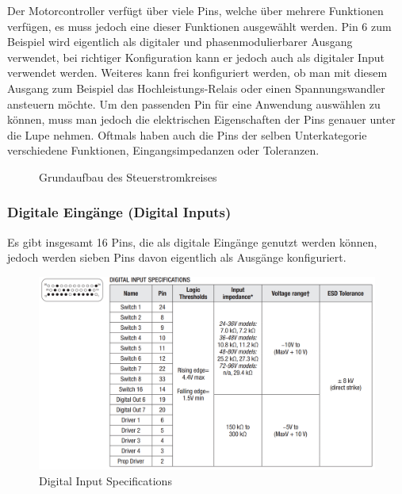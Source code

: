 \vspace{5mm}

Der Motorcontroller verfügt über viele Pins, welche über mehrere Funktionen verfügen, es muss jedoch eine dieser Funktionen ausgewählt werden. Pin 6 zum Beispiel wird eigentlich als digitaler und phasenmodulierbarer Ausgang verwendet, bei richtiger Konfiguration kann er jedoch auch als digitaler Input verwendet werden. Weiteres kann frei konfiguriert werden, ob man mit diesem Ausgang zum Beispiel das Hochleistungs-Relais oder einen Spannungswandler ansteuern möchte. Um den passenden Pin für eine Anwendung auswählen zu können, muss man jedoch die elektrischen Eigenschaften der Pins genauer unter die Lupe nehmen. Oftmals haben auch die Pins der selben Unterkategorie verschiedene Funktionen, Eingangsimpedanzen oder Toleranzen. 

\begin{figure}[H]
	\begin{center}
		\caption{Grundaufbau des Steuerstromkreises}
	\end{center}
\end{figure}

\newpage



\subsubsection{Digitale Eingänge (Digital Inputs)}
Es gibt insgesamt 16 Pins, die als digitale Eingänge genutzt werden können, jedoch werden sieben Pins davon eigentlich als Ausgänge konfiguriert. 

\begin{figure}[H]
	\begin{center}
		\includegraphics[width=\textwidth]{figures/antrieb/Digital_Input_Specifications.png}
		\caption{Digital Input Specifications}
	\end{center}
\end{figure}




